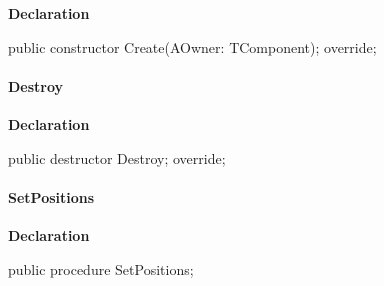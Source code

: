 \documentclass{report}
\newif\ifpdf
\begin{document}
\label{swcatalog.TCTLEntry-Create}
\begin{list}{}{
\setlength{\itemindent}{0cm}
\setlength{\listparindent}{0cm}
\setlength{\leftmargin}{\evensidemargin}
\addtolength{\leftmargin}{\tmplength}
\settowidth{\labelsep}{X}
\addtolength{\leftmargin}{\labelsep}
\setlength{\labelwidth}{\tmplength}
}
\item[\textbf{Declaration}\hfill]
\ifpdf
\begin{flushleft}
\fi
\begin{ttfamily}
public constructor Create(AOwner: TComponent); override;\end{ttfamily}

\ifpdf
\end{flushleft}
\fi

\end{list}
\paragraph*{Destroy}\hspace*{\fill}

\label{swcatalog.TCTLEntry-Destroy}
\begin{list}{}{
\setlength{\itemindent}{0cm}
\setlength{\listparindent}{0cm}
\setlength{\leftmargin}{\evensidemargin}
\addtolength{\leftmargin}{\tmplength}
\settowidth{\labelsep}{X}
\addtolength{\leftmargin}{\labelsep}
\setlength{\labelwidth}{\tmplength}
}
\item[\textbf{Declaration}\hfill]
\ifpdf
\begin{flushleft}
\fi
\begin{ttfamily}
public destructor Destroy; override;\end{ttfamily}

\ifpdf
\end{flushleft}
\fi

\end{list}
\paragraph*{SetPositions}\hspace*{\fill}

\label{swcatalog.TCTLEntry-SetPositions}
\begin{list}{}{
\setlength{\itemindent}{0cm}
\setlength{\listparindent}{0cm}
\setlength{\leftmargin}{\evensidemargin}
\addtolength{\leftmargin}{\tmplength}
\settowidth{\labelsep}{X}
\addtolength{\leftmargin}{\labelsep}
\setlength{\labelwidth}{\tmplength}
}
\item[\textbf{Declaration}\hfill]
\ifpdf
\begin{flushleft}
\fi
\begin{ttfamily}
public procedure SetPositions;\end{ttfamily}

\ifpdf
\end{flushleft}
\fi

\end{list}
\end{document}
